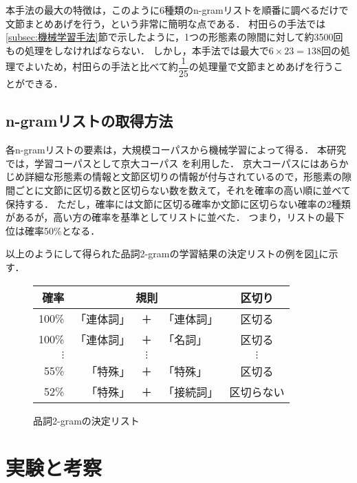 本手法の最大の特徴は，このように{\bold 6種類のn-gramリストを順番に調べるだけで文節まとめあげを行う}，という非常に簡明な点である．
村田らの手法では\ref{subsec:機械学習手法}節で示したように，1つの形態素の隙間に対して約3500回もの処理をしなければならない．
しかし，本手法では最大で$6\times23=138回$の処理でよいため，村田らの手法と比べて約$\dfrac{1}{25}$の処理量で文節まとめあげを行うことができる．


\subsection{n-gramリストの取得方法}\label{subsec:n-gramリスト取得}

各n-gramリストの要素は，大規模コーパスから機械学習によって得る．
本研究では，学習コーパスとして京大コーパス
\cite{KyotoCorpus}
を利用した．
京大コーパスにはあらかじめ詳細な形態素の情報と文節区切りの情報が付与されているので，形態素の隙間ごとに文節に区切る数と区切らない数を数えて，それを確率の高い順に並べて保持する．
ただし，確率には文節に区切る確率か文節に区切らない確率の2種類があるが，高い方の確率を基準としてリストに並べた．
つまり，リストの最下位は確率50\%となる．

以上のようにして得られた品詞2-gramの学習結果の決定リストの例を図\ref{tab:学習結果例}に示す．

\begin{figure}
  \begin{center}
    \begin{tabular}{rr@{ }c@{ }lc}
      確率 & \multicolumn{3}{c}{規則} & 区切り\\
      \hline
      100\% & 「連体詞」 & ＋ & 「連体詞」 & 区切る\\
      100\% & 「連体詞」 & ＋ & 「名詞」   & 区切る\\
      $\vdots$ & & $\vdots$ & & $\vdots$\\
      55\% & 「特殊」 & ＋ & 「特殊」   & 区切る\\
      52\% & 「特殊」 & ＋ & 「接続詞」 & 区切らない\\
    \end{tabular}
    \caption{品詞2-gramの決定リスト}
    
    
    
    \label{tab:学習結果例}
  \end{center}
\end{figure}



\section{実験と考察}\label{sec:実験}


